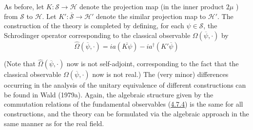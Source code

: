 \documentclass[11pt,a4paper]{article}
\begin{document}
As before, let \(K: \mathcal{S} \to \mathcal{H}\) denote the projection map (in the inner product \(2\mu\) ) from \(\mathcal{S}\) to \(\mathcal{H}\). Let \(K': \overline{\mathcal{S}} \to \mathcal{H}'\) denote the similar projection map to \(\mathcal{H}'\). The construction of the theory is completed by defining, for each \(\psi \in \mathcal{S}\), the Schrodinger operator corresponding to the classical observable \(\Omega(\overline{\psi}, \cdot)\) by
\begin{equation*}
\widehat{\Omega}(\overline{\psi}, \cdot) = ia(\overline{K\psi}) - ia^{\dagger}(K'\overline{\psi}) \tag{4.7.4}\label{eq:4.7.4}
\end{equation*}

(Note that \(\hat{\Omega}(\overline{\psi}, \cdot)\) now is not self-adjoint, corresponding to the fact \hypertarget{source-116}{} that the classical observable \(\Omega(\overline{\psi},\cdot)\) now is not real.) The (very minor) differences occurring in the analysis of the unitary equivalence of different constructions can be found in Wald (1979a). Again, the algebraic structure given by the commutation relations of the fundamental observables (\hyperref[eq:4.7.4]{4.7.4}) is the same for all constructions, and the theory can be formulated via the algebraic approach in the same manner as for the real field.
\end{document}
